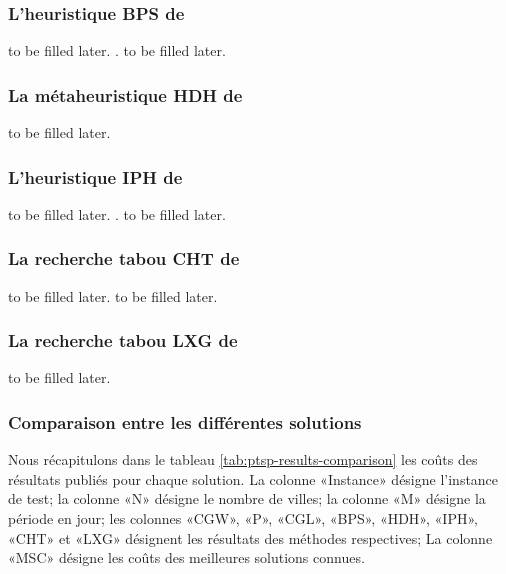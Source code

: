 \medskip

\subsubsection{L'heuristique BPS de \parencite{bertazzi_improved_2004}}to be filled later. \parencite{paletta_period_2002}. to be filled later.

\medskip

\subsubsection{La métaheuristique HDH de \parencite{hemmelmayr_variable_2009}}
\label{sub-sec:hdh}to be filled later.
\medskip

\subsubsection{L'heuristique IPH de \parencite{gulczynski_period_2011}}to be filled later. \parencite{chao_new_1995}. to be filled later.

\medskip


\subsubsection{La recherche tabou CHT de \parencite{cacchiani_set-covering_2014}}to be filled later. \parencite{hemmelmayr_variable_2009} to be filled later.

\medskip


\subsubsection{La recherche tabou LXG de \parencite{liu_hybridization_2014}}to be filled later.

\medskip

\subsubsection{Comparaison entre les différentes solutions}
\label{sec:ptps-comparison}
Nous récapitulons dans le tableau \ref{tab:ptsp-results-comparison} les coûts des résultats publiés pour chaque solution. La colonne «Instance» désigne l'instance de test; la colonne «N» désigne le nombre de villes; la colonne «M» désigne la période en jour; les colonnes «CGW», «P», «CGL», «BPS», «HDH», «IPH», «CHT» et «LXG» désignent les résultats des méthodes respectives; La colonne «MSC» désigne les coûts des meilleures solutions connues.


